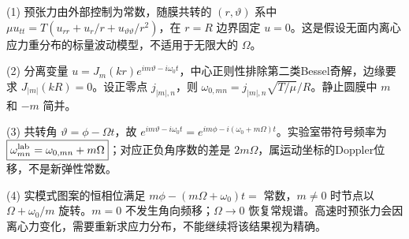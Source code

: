 (1) 预张力由外部控制为常数，随膜共转的 \((r,\vartheta)\) 系中 \(\boxed{\mu u_{tt}=T(u_{rr}+u_r/r+u_{\vartheta\vartheta}/r^2)}\)，在 \(r=R\) 边界固定 \(u=0\)。这是假设无面内离心应力重分布的标量波动模型，不适用于无限大的 \(\Omega\)。

(2) 分离变量 \(u=J_m(kr)e^{im\vartheta-i\omega_0t}\)，中心正则性排除第二类Bessel奇解，边缘要求 \(J_{|m|}(kR)=0\)。设正零点 \(j_{|m|,n}\)，则 \(\boxed{\omega_{0,mn}=j_{|m|,n}\sqrt{T/\mu}/R}\)。静止圆膜中 \(m\) 和 \(-m\) 简并。

(3) 共转角 \(\vartheta=\phi-\Omega t\)，故 \(e^{im\vartheta-i\omega_0t}=e^{im\phi-i(\omega_0+m\Omega)t}\)。实验室带符号频率为 \(\boxed{\omega_{mn}^{\rm lab}=\omega_{0,mn}+m\Omega}\)；对应正负角序数的差是 \(2m\Omega\)，属运动坐标的Doppler位移，不是新弹性常数。

(4) 实模式图案的恒相位满足 \(m\phi-(m\Omega+\omega_0)t=\) 常数，\(m\ne0\) 时节点以 \(\Omega+\omega_0/m\) 旋转。\(m=0\) 不发生角向频移；\(\Omega\to0\) 恢复常规谱。高速时预张力会因离心力变化，需要重新求应力分布，不能继续将该结果视为精确。
